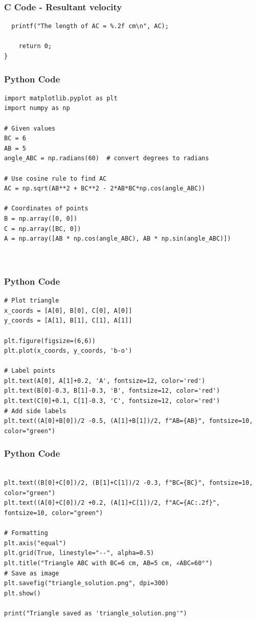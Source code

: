 \documentclass{beamer}
\begin{document}
\begin{frame}[fragile]
    \frametitle{C Code - Resultant velocity}
    \begin{lstlisting}
  printf("The length of AC = %.2f cm\n", AC);

    return 0;
}
    \end{lstlisting}
\end{frame}
\begin{frame}[fragile]
    \frametitle{Python Code}
    \begin{lstlisting}
import matplotlib.pyplot as plt
import numpy as np

# Given values
BC = 6
AB = 5
angle_ABC = np.radians(60)  # convert degrees to radians

# Use cosine rule to find AC
AC = np.sqrt(AB**2 + BC**2 - 2*AB*BC*np.cos(angle_ABC))

# Coordinates of points
B = np.array([0, 0])
C = np.array([BC, 0])
A = np.array([AB * np.cos(angle_ABC), AB * np.sin(angle_ABC)])



    \end{lstlisting}
\end{frame}

\begin{frame}[fragile]
    \frametitle{Python Code}
    \begin{lstlisting}
# Plot triangle
x_coords = [A[0], B[0], C[0], A[0]]
y_coords = [A[1], B[1], C[1], A[1]]

plt.figure(figsize=(6,6))
plt.plot(x_coords, y_coords, 'b-o')

# Label points
plt.text(A[0], A[1]+0.2, 'A', fontsize=12, color='red')
plt.text(B[0]-0.3, B[1]-0.3, 'B', fontsize=12, color='red')
plt.text(C[0]+0.1, C[1]-0.3, 'C', fontsize=12, color='red')
# Add side labels
plt.text((A[0]+B[0])/2 -0.5, (A[1]+B[1])/2, f"AB={AB}", fontsize=10, color="green")
    \end{lstlisting}
\end{frame}

\begin{frame}[fragile]
    \frametitle{Python Code}
    \begin{lstlisting}

plt.text((B[0]+C[0])/2, (B[1]+C[1])/2 -0.3, f"BC={BC}", fontsize=10, color="green")
plt.text((A[0]+C[0])/2 +0.2, (A[1]+C[1])/2, f"AC={AC:.2f}", fontsize=10, color="green")

# Formatting
plt.axis("equal")
plt.grid(True, linestyle="--", alpha=0.5)
plt.title("Triangle ABC with BC=6 cm, AB=5 cm, ∠ABC=60°")
# Save as image
plt.savefig("triangle_solution.png", dpi=300)
plt.show()

print("Triangle saved as 'triangle_solution.png'")
    \end{lstlisting}
\end{frame}
\end{document}
